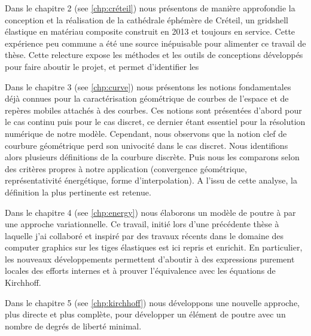 Dans le chapitre 2 (see \cref{chp:créteil}) nous présentons de manière approfondie la conception et la réalisation de la cathédrale éphémère de Créteil, un gridshell élastique en matériau composite construit en 2013 et toujours en service. Cette expérience peu commune a été une source inépuisable pour alimenter ce travail de thèse. Cette relecture expose les méthodes et les outils de conceptions développés pour faire aboutir le projet, et permet d'identifier les 

Dans le chapitre 3 (see \cref{chp:curve}) nous présentons les notions fondamentales déjà connues pour la caractérisation géométrique de courbes de l'espace et de repères mobiles attachés à des courbes. Ces notions sont présentées d'abord pour le cas continu puis pour le cas discret, ce dernier étant essentiel pour la résolution numérique de notre modèle. Cependant, nous observons que la notion clef de courbure géométrique perd son univocité dans le cas discret. Nous identifions alors plusieurs définitions de la courbure discrète. Puis nous les comparons selon des critères propres à notre application (convergence géométrique, représentativité énergétique, forme d'interpolation). A l'issu de cette analyse, la définition la plus pertinente est retenue.

Dans le chapitre 4 (see \cref{chp:energy}) nous élaborons un modèle de poutre à  par une approche variationnelle. Ce travail, initié lors d'une précédente thèse à laquelle j'ai collaboré et inspiré par des travaux récents dans le domaine des computer graphics sur les tiges élastiques est ici repris et enrichit. En particulier, les nouveaux développements permettent d'aboutir à des expressions purement locales des efforts internes et à prouver l'équivalence avec les équations de Kirchhoff.

Dans le chapitre 5 (see \cref{chp:kirchhoff}) nous développons une nouvelle approche, plus directe et plus complète, pour développer un élément de poutre avec un nombre de degrés de liberté minimal.
%
%
% 
%
%
%
%
%

